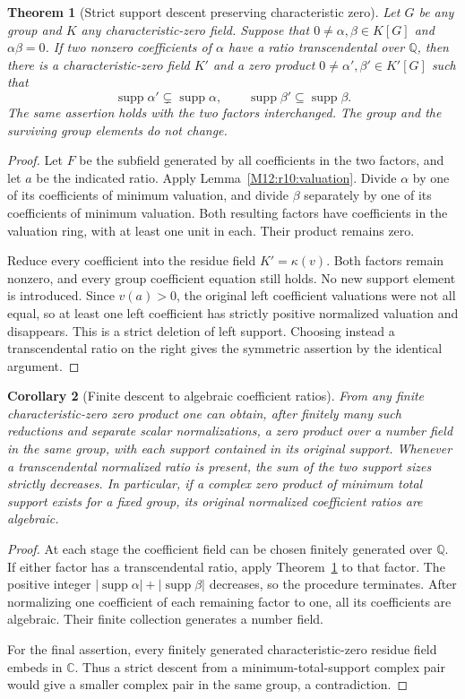 \documentclass[11pt,a4paper,oneside]{report}
\newtheorem{theorem}{Theorem}[section]
\newtheorem{corollary}[theorem]{Corollary}
\theoremstyle{definition}
\theoremstyle{remark}
\DeclareMathOperator{\supp}{supp}
\newcommand{\C}{\mathbb C}
\newcommand{\Q}{\mathbb Q}
\begin{document}
\begin{theorem}[Strict support descent preserving characteristic zero]
\label{M12:r10:deletion}
Let $G$ be any group and $K$ any characteristic-zero field.
Suppose that $0\ne\alpha,\beta\in K[G]$ and $\alpha\beta=0$.
If two nonzero coefficients of $\alpha$ have a ratio transcendental
over $\Q$, then there is a characteristic-zero field $K'$ and a
zero product $0\ne\alpha',\beta'\in K'[G]$ such that
\[
 \supp\alpha'\subsetneq\supp\alpha,
 \qquad \supp\beta'\subseteq\supp\beta.
\]
The same assertion holds with the two factors interchanged.
The group and the surviving group elements do not change.
\end{theorem}
\begin{proof}
Let $F$ be the subfield generated by all coefficients in the two
factors, and let $a$ be the indicated ratio. Apply
Lemma~\ref{M12:r10:valuation}. Divide $\alpha$ by one of its coefficients
of minimum valuation, and divide $\beta$ separately by one of its
coefficients of minimum valuation. Both resulting factors have
coefficients in the valuation ring, with at least one unit in each.
Their product remains zero.

Reduce every coefficient into the residue field $K'=\kappa(v)$.
Both factors remain nonzero, and every group coefficient equation
still holds. No new support element is introduced. Since $v(a)>0$,
the original left coefficient valuations were not all equal, so
at least one left coefficient has strictly positive normalized
valuation and disappears. This is a strict deletion of left
support. Choosing instead a transcendental ratio on the right gives
the symmetric assertion by the identical argument.
\end{proof}

\begin{corollary}[Finite descent to algebraic coefficient ratios]
\label{M12:r10:termination}
From any finite characteristic-zero zero product one can obtain,
after finitely many such reductions and separate scalar
normalizations, a zero product over a number field in the same group,
with each support contained in its original support.
Whenever a transcendental normalized ratio is present, the sum of
the two support sizes strictly decreases. In particular, if a
complex zero product of minimum total support exists for a fixed
group, its original normalized coefficient ratios are algebraic.
\end{corollary}
\begin{proof}
At each stage the coefficient field can be chosen finitely generated
over $\Q$. If either factor has a transcendental ratio, apply
Theorem~\ref{M12:r10:deletion} to that factor. The positive integer
$|\supp\alpha|+|\supp\beta|$ decreases, so the procedure terminates.
After normalizing one coefficient of each remaining factor to one,
all its coefficients are algebraic. Their finite collection generates
a number field.

For the final assertion, every finitely generated
characteristic-zero residue field embeds in $\C$. Thus a strict
descent from a minimum-total-support complex pair would give a
smaller complex pair in the same group, a contradiction.
\end{proof}
\end{document}

